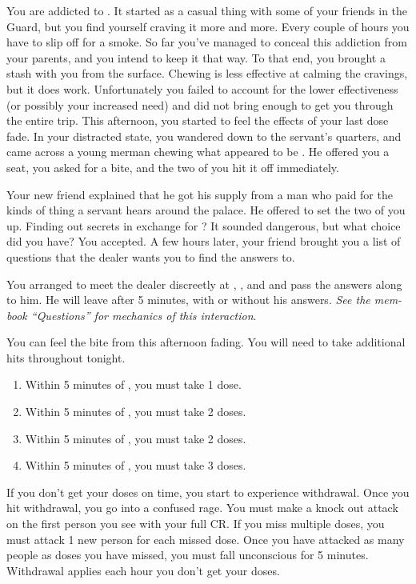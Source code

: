 \documentclass[green]{NeptuneBall}
\begin{document}
\name{\gAddicted{}}

You are addicted to \iDrug{}. It started as a casual thing with some of your friends in the Guard, but you find yourself craving it more and more. Every couple of hours you have to slip off for a smoke. So far you've managed to conceal this addiction from your parents, and you intend to keep it that way. To that end, you brought a stash with you from the surface. Chewing \iDrug{} is less effective at calming the cravings, but it does work. Unfortunately you failed to account for the lower effectiveness (or possibly your increased need) and did not bring enough to get you through the entire trip. This afternoon, you started to feel the effects of your last dose fade. In your distracted state, you wandered down to the servant's quarters, and came across a young merman chewing what appeared to be \iDrug{}. He offered you a seat, you asked for a bite, and the two of you hit it off immediately.

Your new friend explained that he got his supply from a man who paid for the kinds of thing a servant hears around the palace. He offered to set the two of you up. Finding out secrets in exchange for \iDrug{}? It sounded dangerous, but what choice did you have? You accepted. A few hours later, your friend brought you a list of questions that the dealer wants you to find the answers to.

You arranged to meet the dealer discreetly at \cTFifteen{\MYname{}}, \cTOneFifteen{\MYname{}}, \cTTwoFifteen{\MYname{}} and \cTThreeFifteen{\MYname{}} and pass the answers along to him. He will leave after 5 minutes, with or without his answers. \emph{See the mem-book ``Questions'' for mechanics of this interaction}.

You can feel the bite from this afternoon fading. You will need to take additional hits throughout tonight.
\begin{enumerate}
	\item Within 5 minutes of \cTFifteen{\MYname{}}, you must take 1 dose.
	\item Within 5 minutes of \cTOneFifteen{\MYname{}}, you must take 2 doses.
	\item Within 5 minutes of \cTTwoFifteen{\MYname{}}, you must take 2 doses.
	\item Within 5 minutes of \cTThreeFifteen{\MYname{}}, you must take 3 doses.
\end{enumerate}

If you don't get your doses on time, you start to experience withdrawal. Once you hit withdrawal, you go into a confused rage. You must make a knock out attack on the first person you see with your full CR. If you miss multiple doses, you must attack 1 new person for each missed dose. Once you have attacked as many people as doses you have missed, you must fall unconscious for 5 minutes. Withdrawal applies each hour you don't get your doses.
\end{document}
